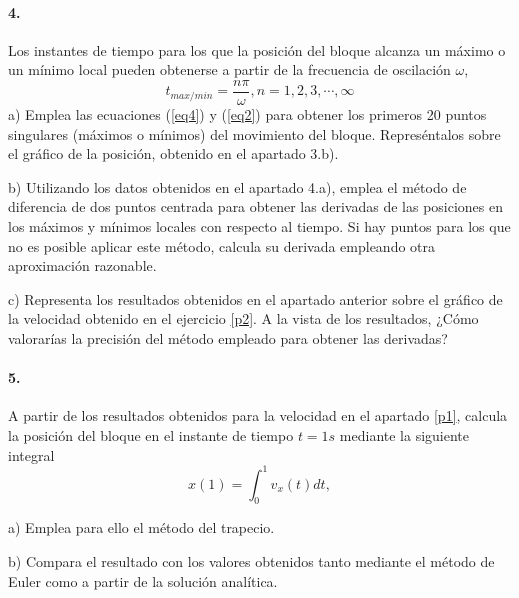 \paragraph{4.} Los instantes de tiempo para los que la posición del bloque alcanza un máximo o un mínimo local pueden obtenerse a partir de la frecuencia de oscilación $\omega$,
\begin{equation}\label{eq4}
t_{max/min} = \frac{n \pi}{\omega}, n = 1,2,3,\cdots, \infty
\end{equation}
a) Emplea las ecuaciones (\ref{eq4}) y (\ref{eq2}) para obtener los primeros 20 puntos singulares (máximos o mínimos) del movimiento del bloque. Represéntalos sobre el gráfico de la posición, obtenido en el apartado 3.b).

b) Utilizando los datos obtenidos en el apartado 4.a), emplea el método de diferencia de dos puntos centrada para obtener las derivadas de las posiciones en los máximos y mínimos locales con respecto al tiempo. Si hay puntos para los que no es posible aplicar este método, calcula su derivada empleando otra aproximación razonable.
 
c) Representa los resultados obtenidos en el apartado anterior sobre el gráfico de la velocidad obtenido en el ejercicio \ref{p2}. A la vista de los resultados, ¿Cómo valorarías la precisión del método empleado para obtener las derivadas? 

\paragraph{5.} A partir de los resultados obtenidos para la velocidad en el apartado \ref{p1}, calcula la posición del bloque en el instante de tiempo $t=1s$ mediante la siguiente integral
\begin{equation}
x(1) = \int_0^1v_x(t)dt,
\end{equation}

a) Emplea para ello el método del trapecio.

b) Compara el resultado con los valores obtenidos tanto mediante el método de Euler como a partir de la solución analítica.



